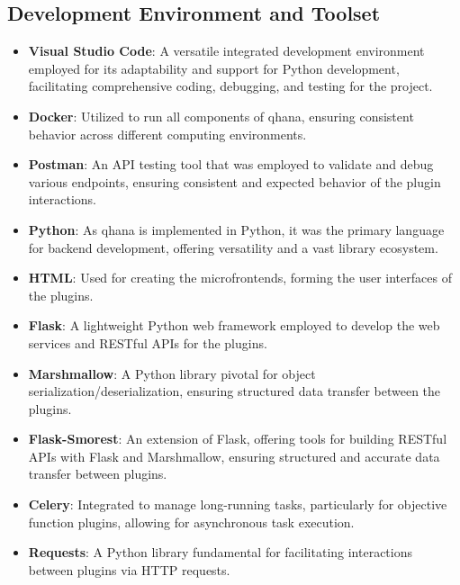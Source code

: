 \documentclass[
  a4paper,  %
  twoside,  %
  bibliography=totoc,
  headsepline,
  cleardoublepage=empty,
  parskip=half,
  draft=false
]{scrbook}
\begin{document}
\subsection{Development Environment and Toolset}

\begin{itemize}
    \item \textbf{Visual Studio Code}: A versatile integrated development environment employed for its adaptability and support for Python development, facilitating comprehensive coding, debugging, and testing for the project.

    \item \textbf{Docker}: Utilized to run all components of \gls{qhana}, ensuring consistent behavior across different computing environments.

    \item \textbf{Postman}: An API testing tool that was employed to validate and debug various endpoints, ensuring consistent and expected behavior of the plugin interactions.

    \item \textbf{Python}: As \gls{qhana} is implemented in Python, it was the primary language for backend development, offering versatility and a vast library ecosystem.

    \item \textbf{HTML}: Used for creating the microfrontends, forming the user interfaces of the plugins.

    \item \textbf{Flask}: A lightweight Python web framework employed to develop the web services and RESTful APIs for the plugins.

    \item \textbf{Marshmallow}: A Python library pivotal for object serialization/deserialization, ensuring structured data transfer between the plugins.

    \item \textbf{Flask-Smorest}: An extension of Flask, offering tools for building RESTful APIs with Flask and Marshmallow, ensuring structured and accurate data transfer between plugins.

    \item \textbf{Celery}: Integrated to manage long-running tasks, particularly for objective function plugins, allowing for asynchronous task execution.

    \item \textbf{Requests}: A Python library fundamental for facilitating interactions between plugins via HTTP requests.
\end{itemize}
\end{document}
